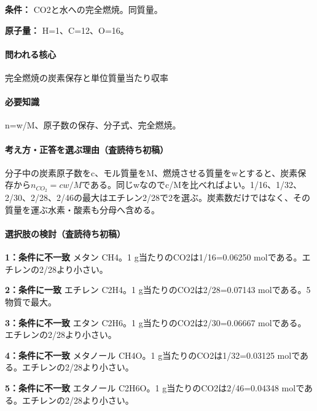 \noindent\textbf{条件：} CO2と水への完全燃焼。同質量。\par

\noindent\textbf{原子量：} H=\allowbreak{}1、C=\allowbreak{}12、O=\allowbreak{}16。\par

\paragraph{問われる核心} 完全燃焼の炭素保存と単位質量当たり収率

\paragraph{必要知識} n=\allowbreak{}w/M、原子数の保存、分子式、完全燃焼。

\paragraph{考え方・正答を選ぶ理由（査読待ち初稿）} 分子中の炭素原子数をc、モル質量をM、燃焼させる質量をwとすると、炭素保存から\(n_{CO_2}=c w/M\)である。同じwなのでc/Mを比べればよい。1/16、1/32、2/30、2/28、2/46の最大はエチレン2/28で2を選ぶ。炭素数だけではなく、その質量を運ぶ水素・酸素も分母へ含める。

\paragraph{選択肢の検討（査読待ち初稿）}\mbox{}\par

\noindent\textbf{1：条件に不一致} メタン CH4。1 g当たりのCO2は1/16=\allowbreak{}0.06250 molである。エチレンの2/28より小さい。\par

\noindent\textbf{2：条件に一致} エチレン C2H4。1 g当たりのCO2は2/28=\allowbreak{}0.07143 molである。5物質で最大。\par

\noindent\textbf{3：条件に不一致} エタン C2H6。1 g当たりのCO2は2/30=\allowbreak{}0.06667 molである。エチレンの2/28より小さい。\par

\noindent\textbf{4：条件に不一致} メタノール CH4O。1 g当たりのCO2は1/32=\allowbreak{}0.03125 molである。エチレンの2/28より小さい。\par

\noindent\textbf{5：条件に不一致} エタノール C2H6O。1 g当たりのCO2は2/46=\allowbreak{}0.04348 molである。エチレンの2/28より小さい。\par

